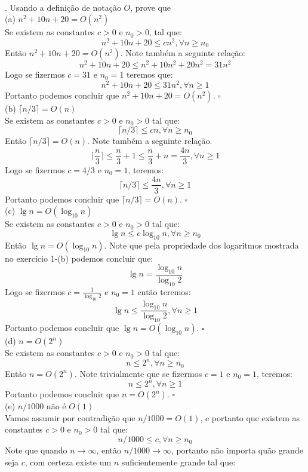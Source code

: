 \\[12pt]
. Usando a definição de notação $O$, prove que \\[6pt]
(a) $n^2 + 10n + 20 = O(n^2)$ 
\\[6pt]
Se existem as constantes $c > 0$ e $n_0 > 0$, tal que: 
\[ n^2 + 10n + 20 \leq cn^2, \forall n \geq n_0 \]
Então $n^2 + 10n + 20 = O(n^2)$. Note também a seguinte relação:
\[ n^2 + 10n + 20 \leq n^2 + 10n^2 + 20n^2 = 31n^2 \]
Logo se fizermos $c = 31$ e $n_0 = 1$ teremos que:
\[ n^2 + 10n + 20 \leq 31n^2, \forall n \geq 1 \]
Portanto podemos concluir que $n^2 + 10n + 20 = O(n^2)$. $\square$
\\[6pt]
(b) $\lceil n/3 \rceil = O(n)$
\\[6pt]
Se existem as constantes $c > 0$ e $n_0 > 0$ tal que:
\[ \lceil n/3 \rceil \leq cn, \forall n \geq n_0 \]
Então $\lceil n/3 \rceil = O(n)$. Note também a seguinte relação.
\[ \lceil \frac{n}{3} \rceil \leq \frac{n}{3} + 1 \leq \frac{n}{3} + n = \frac{4n}{3}, \forall n \geq 1 \]
Logo se fizermos $c = 4/3$ e $n_0 = 1$, teremos:
\[ \lceil n/3 \rceil \leq \frac{4n}{3}, \forall n \geq 1 \]
Portanto podemos concluir que $\lceil n/3 \rceil = O(n)$. $\square$
\\[6pt]
(c) $\lg n = O(\log_{10} n)$ 
\\[6pt]
Se existem as constantes $c > 0$ e $n_0 > 0$ tal que:
\[ \lg n \leq c \log_{10} n, \forall n \geq n_0 \]
Então $\lg n = O(\log_{10} n)$. Note que pela propriedade dos logaritmos mostrada no exercício 1-(b) podemos concluir que:
\[ \lg n = \frac{\log_{10} n}{\log_{10} 2}\]
Logo se fizermos $c = \frac{1}{\log_{10} 2}$ e $n_0 = 1$ então teremos:
\[ \lg n \leq \frac{\log_{10} n}{\log_{10} 2}, \forall n \geq 1 \]
Portanto podemos concluir que $\lg n = O(\log_{10} n)$. $\square$
\\[6pt]
(d) $n = O(2^n)$
\\[6pt]
Se existem as constantes $c > 0$ e $n_0 > 0$ tal que:
\[ n \leq 2^n, \forall n \geq n_0 \]
Então $n = O(2^n)$. Note trivialmente que se fizermos $c = 1$ e $n_0 = 1$, teremos:
\[ n \leq 2^n, \forall n \geq 1 \]
Portanto podemos concluir que $n = O(2^n)$. $\square$
\\[6pt]
(e) $n/1000$ não é $O(1)$
\\[6pt]
Vamos assumir por contradição que $n/1000 = O(1)$, e portanto que existem as constantes $c > 0$ e $n_0 > 0$ tal que:
\[ n/1000 \leq c, \forall n \geq n_0 \]
Note que quando $n \rightarrow \infty$, então $n/1000 \rightarrow \infty$, portanto não importa quão grande seja $c$, com certeza existe um $n$ suficientemente grande tal que:
